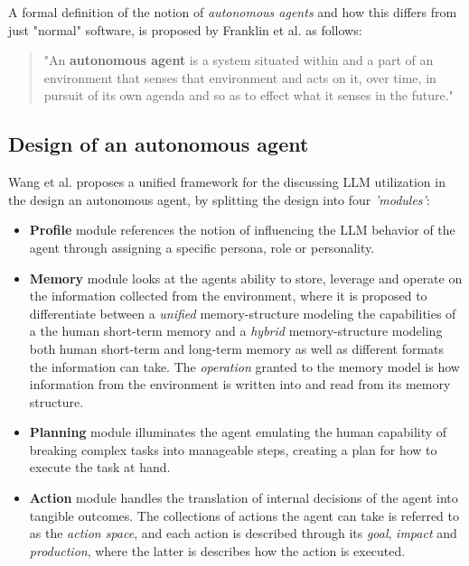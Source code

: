 A formal definition of the notion of \textit{autonomous agents} and how this differs from just "normal" software, is proposed by Franklin et al. as follows:
\begin{quote}
    "An \textbf{autonomous agent} is a system situated within and a part of an environment that senses that environment and acts on it, over time, in pursuit of its own agenda and so as to effect what it senses in the future."\cite{franklin1996agent}
\end{quote}

\subsection{Design of an autonomous agent}
\label{sec:BackgroundAgentDesign}
Wang et al.\cite{wang2024survey} proposes a unified framework for the discussing LLM utilization in the design an autonomous agent, by splitting the design into four \textit{'modules'}:
\begin{itemize}
    \item \textbf{Profile} module references the notion of influencing the LLM behavior of the agent through assigning a specific persona, role or personality. 
    \item \textbf{Memory} module looks at the agents ability to store, leverage and operate on the information collected from the environment, where it is proposed to differentiate between a \textit{unified} memory-structure modeling the capabilities of a the human short-term memory and a \textit{hybrid} memory-structure modeling both human short-term and long-term memory as well as different formats the information can take. The \textit{operation} granted to the memory model is how information from the environment is written into and read from its memory structure.
    \item \textbf{Planning} module illuminates the agent emulating the human capability of breaking complex tasks into manageable steps, creating a plan for how to execute the task at hand. 
    \item \textbf{Action} module handles the translation of internal decisions of the agent into tangible outcomes. The collections of actions the agent can take is referred to as the \textit{action space}, and each action is described through its \textit{goal}, \textit{impact} and \textit{production}, where the latter is describes how the action is executed.
\end{itemize}

